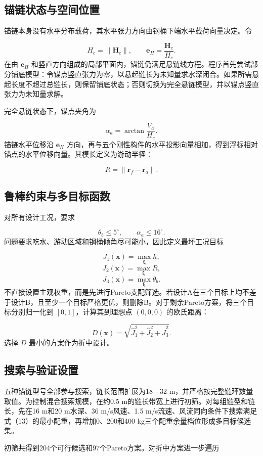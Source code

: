 \documentclass[UTF8,zihao=-4,a4paper,fontset=fandol]{ctexart}
\begin{document}
\subsection{锚链状态与空间位置}
锚链本身没有水平分布载荷，其水平张力方向由钢桶下端水平载荷向量决定。令

\[
H_c=\|\boldsymbol H_c\|,
\qquad
\boldsymbol e_H=\frac{\boldsymbol H_c}{H_c}.
\]
在由 \(\boldsymbol e_H\) 和竖直方向组成的局部平面内，锚链仍满足悬链线方程。程序首先尝试部分铺底模型：令锚点竖直张力为零，以悬起链长为未知量求水深闭合。如果所需悬起长度不超过总链长，则保留铺底状态；否则切换为完全悬链模型，并以锚点竖直张力为未知量求解。

完全悬链状态下，锚点夹角为

\[
\alpha_a=\arctan\frac{V_a}{H_c}. \tag{11}
\]
锚链水平位移沿 \(\boldsymbol e_H\) 方向，再与五个刚性构件的水平投影向量相加，得到浮标相对锚点的水平位移向量。其模长定义为游动半径：

\[
R=\|\boldsymbol r_f-\boldsymbol r_a\|. \tag{12}
\]
\subsection{鲁棒约束与多目标函数}
对所有设计工况，要求

\[
\theta_b\le5^\circ,
\qquad
\alpha_a\le16^\circ. \tag{13}
\]
问题要求吃水、游动区域和钢桶倾角尽可能小，因此定义最坏工况目标

\[
J_1(\boldsymbol x)=\max_{\boldsymbol\xi}h,
\]
\[
J_2(\boldsymbol x)=\max_{\boldsymbol\xi}R,
\]
\[
J_3(\boldsymbol x)=\max_{\boldsymbol\xi}\theta_b. \tag{14}
\]
不直接设置主观权重，而是先进行Pareto支配筛选。若设计A在三个目标上均不差于设计B，且至少一个目标严格更优，则删除B。对于剩余Pareto方案，将三个目标分别归一化到 \([0,1]\)，计算其到理想点 \((0,0,0)\) 的欧氏距离：

\[
D(\boldsymbol x)=
\sqrt{\hat J_1^2+\hat J_2^2+\hat J_3^2}. \tag{15}
\]
选择 \(D\) 最小的方案作为折中设计。

\subsection{搜索与验证设置}
五种锚链型号全部参与搜索，链长范围扩展为18—32 m，并严格按完整链环数量取值。为控制混合搜索规模，在约0.5 m的链长带宽上进行初筛。对每组链型和链长，先在16 m和20 m水深、36 m/s风速、1.5 m/s流速、风流同向条件下搜索满足式（13）的最小配重，再增加0、200和400 kg三个配重余量档位形成多目标候选集。

初筛共得到204个可行候选和97个Pareto方案。对折中方案进一步遍历
\end{document}
